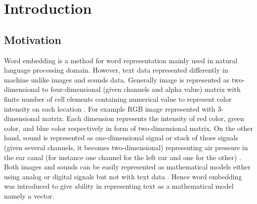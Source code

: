 \chapter{Introduction}
\label{chap:intro}

\section{Motivation} 
    Word embedding is a method for word representation mainly used in
    natural language processing domain. However, text data represented
    differently in machine unlike images and sounds data. Generally
    image is represented as two-dimensional to four-dimensional (given
    channels and alpha value) matrix with finite number of cell
    elements containing numerical value to represent color intensity
    on each location \citep{imageprocessing2018tyagi}. For example RGB
    image represented with 3-dimensional matrix. Each dimension
    represents the intensity of red color, green color, and blue color
    respectively in form of two-dimensional matrix. On the other hand,
    sound is represented as one-dimensional signal or stack of those
    signals (given several channels, it becomes two-dimensional)
    representing air pressure in the ear canal (for instance one
    channel for the left ear and one for the other)
    \citep{sound1995rocchesso}. Both images and sounds can be easily
    represented as mathematical models either using analog or digital
    signals but not with text data \citep{wordembedding2017yang}.
    Hence word embedding was introduced to give ability in
    representing text as a mathematical model namely a vector.
    
